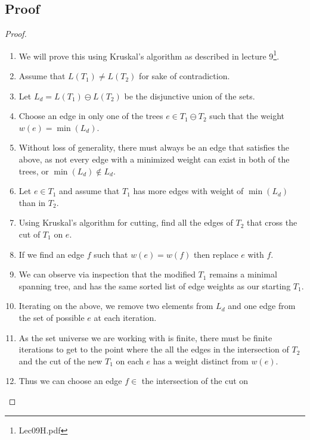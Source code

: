 \documentclass{article}
\begin{document}
\subsection{Proof}
\begin{proof}
      \begin{enumerate}
            \item We will prove this using Kruskal's algorithm as described in lecture 9\footnote{Lec09H.pdf}.
            \item Assume that \(L(T_1) \neq L(T_2)\) for sake of contradiction.
            \item Let \(L_d = L(T_1) \ominus L(T_2) \) be the disjunctive union of the
                  sets.
            \item Choose an edge in only one of the trees \( e \in T_1 \ominus T_2\) such
                  that the weight \(w(e) = \min(L_d) \).
            \item Without loss of generality, there must always be an edge that satisfies the above, as not every edge
                  with a minimized weight can exist in both of the trees, or \(\min(L_d)
                  \notin L_d \).
            \item Let \( e\in T_1 \) and assume that \(T_1\)
                  has more edges with weight of \(\min(L_d)\) than in \(T_2\).
            \item Using Kruskal's algorithm for cutting, find all the edges of \(T_2\)
                  that cross the cut of \(T_1\) on \(e\).
            \item If we find an edge \(f\) such that \(w(e) = w(f)\) then replace \(e\)
                  with \(f\).
            \item We can observe via inspection that the modified \(T_1\) remains a minimal spanning
                  tree, and has the same sorted list of edge weights as our starting
                  \(T_1\).
            \item Iterating on the above, we remove two elements from \(L_d\)
                  and one edge from the set of possible \(e\) at each iteration.
            \item As the set universe we are working with is finite, there must be finite
                  iterations to get to the point where the all the edges in the
                  intersection of \(T_2\) and the cut of the new \(T_1\) on each \(e\) has
                  a weight distinct from \(w(e)\).
            \item Thus we can choose an edge \(f \in \) the intersection of the cut on

\end{enumerate}
\end{proof}
\end{document}
